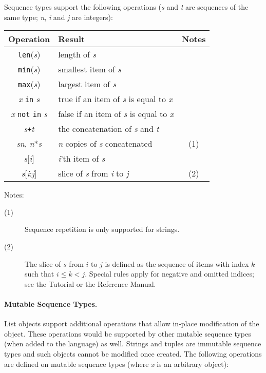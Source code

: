 Sequence types support the following operations ({\em s} and {\em t} are
sequences of the same type; {\em n}, {\em i} and {\em j} are integers):

\begin{center}
\begin{tabular}{|c|l|c|}
\hline
Operation & Result & Notes \\
\hline
{\tt len}({\em s}) & length of {\em s} & \\
{\tt min}({\em s}) & smallest item of {\em s} & \\
{\tt max}({\em s}) & largest item of {\em s} & \\
{\em x} {\tt in} {\em s} &
	true if an item of {\em s} is equal to {\em x} & \\
{\em x} {\tt not} {\tt in} {\em s} &
	false if an item of {\em s} is equal to {\em x} & \\
{\em s}{\tt +}{\em t} & the concatenation of {\em s} and {\em t} & \\
{\em s}{\tt *}{\em n}, {\em n}*{\em s} &
	{\em n} copies of {\em s} concatenated & (1) \\
{\em s}[{\em i}] & {\em i}'th item of {\em s} & \\
{\em s}[{\em i}:{\em j}] &
	slice of {\em s} from {\em i} to {\em j} & (2) \\
\hline
\end{tabular}
\end{center}

\noindent
Notes:
\begin{description}
\item[(1)]
Sequence repetition is only supported for strings.
\item[(2)]
The slice of $s$ from $i$ to $j$ is defined as the sequence
of items with index $k$ such that $i \leq k < j$.
Special rules apply for negative and omitted indices; see the Tutorial
or the Reference Manual.
\end{description}

\paragraph{Mutable Sequence Types.}

List objects support additional operations that allow in-place
modification of the object.
These operations would be supported by other mutable sequence types
(when added to the language) as well.
Strings and tuples are immutable sequence types and such objects cannot
be modified once created.
The following operations are defined on mutable sequence types (where
{\em x} is an arbitrary object):

